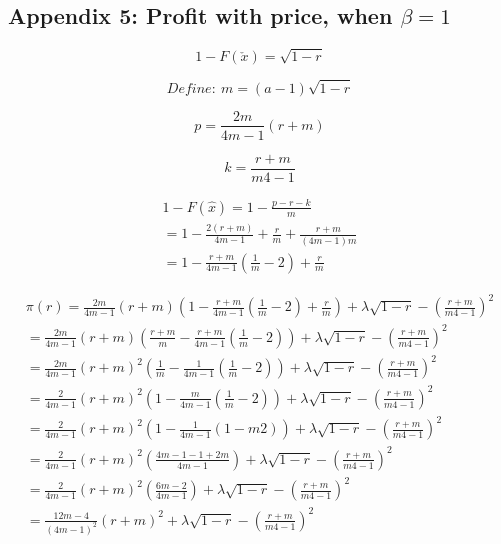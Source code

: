 \documentclass{article}
\begin{document}
\subsection{Appendix 5: Profit with price, when $\beta=1$}

\[1-F(\check{x})= \sqrt{1-r}\]

\[Define:~ 
m = (a-1)\sqrt{1-r}
\]

\[
p = \frac{2m}{4m-1}\left(r+m \right)
\]

\[
k = \frac{r+m}{m4-1}
\]

\[
\begin{array}{ll}
1-F(\hat{x})= 1-\frac{p-r-k}{m} \\
=1-\frac{2(r+m)}{4m-1} + \frac{r}{m} + \frac{r+m}{(4m-1)m} \\
=1-\frac{r+m}{4m-1}\left(\frac{1}{m} -2 \right) + \frac{r}{m}
\end{array}
\]

\[
\begin{array}{ll}
\pi(r) = \frac{2m}{4m-1}\left(r+m \right) \left(1-\frac{r+m}{4m-1}\left(\frac{1}{m} -2 \right) + \frac{r}{m} \right) + \lambda \sqrt{1-r} - \left(\frac{r+m}{m4-1} \right)^2 \\ 
= \frac{2m}{4m-1}\left(r+m \right) \left(\frac{r+m}{m}-\frac{r+m}{4m-1}\left(\frac{1}{m} -2 \right)  \right) + \lambda \sqrt{1-r} - \left(\frac{r+m}{m4-1} \right)^2 \\
= \frac{2m}{4m-1}\left(r+m \right)^2 \left(\frac{1}{m}-\frac{1}{4m-1}\left(\frac{1}{m} -2 \right)   \right) + \lambda \sqrt{1-r} - \left(\frac{r+m}{m4-1} \right)^2 \\
= \frac{2}{4m-1}\left(r+m \right)^2 \left(1-\frac{m}{4m-1}\left(\frac{1}{m} -2 \right)   \right) + \lambda \sqrt{1-r} - \left(\frac{r+m}{m4-1} \right)^2 \\
= \frac{2}{4m-1}\left(r+m \right)^2 \left(1-\frac{1}{4m-1}\left(1 -m2 \right)   \right) + \lambda \sqrt{1-r} - \left(\frac{r+m}{m4-1} \right)^2 \\
= \frac{2}{4m-1}\left(r+m \right)^2 \left(\frac{4m-1-1+2m}{4m-1}  \right) + \lambda \sqrt{1-r} - \left(\frac{r+m}{m4-1} \right)^2 \\
= \frac{2}{4m-1}\left(r+m \right)^2 \left( \frac{6m-2}{4m-1}  \right) + \lambda \sqrt{1-r} - \left(\frac{r+m}{m4-1} \right)^2 \\
= \frac{12m-4}{(4m-1)^2}\left(r+m \right)^2 + \lambda \sqrt{1-r} - \left(\frac{r+m}{m4-1} \right)^2 \\
\end{array}
\]
\end{document}
